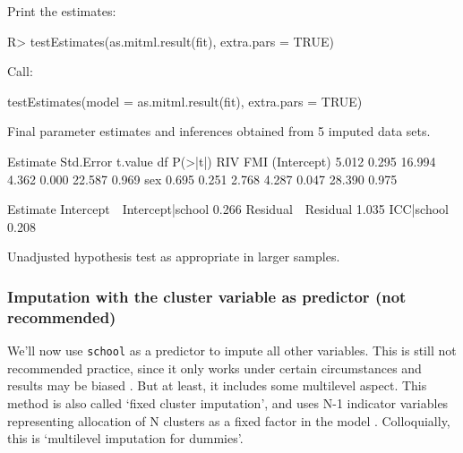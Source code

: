 \documentclass[
]{jss}
\begin{document}
Print the estimates:

\begin{CodeChunk}
\begin{CodeInput}
R> testEstimates(as.mitml.result(fit), extra.pars = TRUE)
\end{CodeInput}
\begin{CodeOutput}

Call:

testEstimates(model = as.mitml.result(fit), extra.pars = TRUE)

Final parameter estimates and inferences obtained from 5 imputed data sets.

             Estimate Std.Error   t.value        df   P(>|t|)       RIV       FMI 
(Intercept)     5.012     0.295    16.994     4.362     0.000    22.587     0.969 
sex             0.695     0.251     2.768     4.287     0.047    28.390     0.975 

                            Estimate 
Intercept~~Intercept|school    0.266 
Residual~~Residual             1.035 
ICC|school                     0.208 

Unadjusted hypothesis test as appropriate in larger samples.
\end{CodeOutput}
\end{CodeChunk}

\hypertarget{imputation-with-the-cluster-variable-as-predictor-not-recommended}{%
\subsubsection{Imputation with the cluster variable as predictor (not
recommended)}\label{imputation-with-the-cluster-variable-as-predictor-not-recommended}}

We'll now use \texttt{school} as a predictor to impute all other
variables. This is still not recommended practice, since it only works
under certain circumstances and results may be biased
\citep{drec15, ende16}. But at least, it includes some multilevel
aspect. This method is also called `fixed cluster imputation', and uses
N-1 indicator variables representing allocation of N clusters as a fixed
factor in the model \citep{reit06, ende16}. Colloquially, this is
`multilevel imputation for dummies'.
\end{document}
